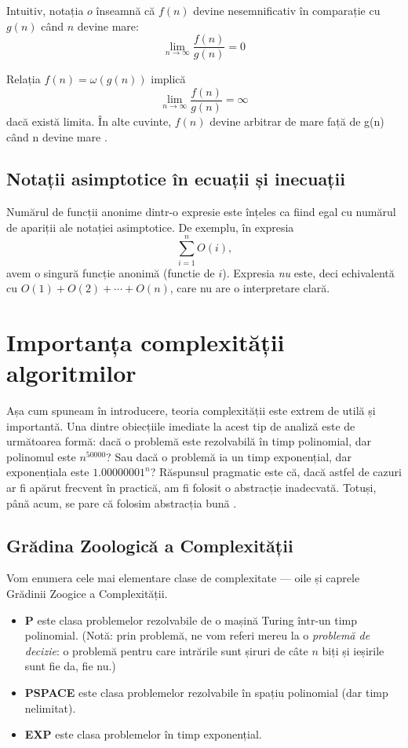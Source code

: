 \documentclass{article}
\begin{document}
Intuitiv, notația $o$ înseamnă că $f(n)$ devine nesemnificativ în comparație cu
$g(n)$ când $n$ devine mare:
\begin{equation*}
	\lim_{n \to \infty} \frac{f(n)}{g(n)} = 0
\end{equation*}

Relația $f(n) = \omega(g(n))$ implică
\begin{equation*}
	\lim_{n \to \infty} \frac{f(n)}{g(n)} = \infty
\end{equation*}
dacă există limita. În alte cuvinte, $f(n)$ devine arbitrar de mare față de g(n)
când n devine mare \cite{clrs}.

\subsection{Notații asimptotice în ecuații și inecuații}
Numărul de funcții anonime dintr-o expresie este înțeles ca fiind egal cu
numărul de apariții ale notației asimptotice. De exemplu, în expresia
\begin{equation*}
	\sum_{i = 1}^{n} O(i) \text{,}
\end{equation*}
avem o singură funcție anonimă (functie de $i$). Expresia \emph{nu} este,
deci echivalentă cu $O(1) + O(2) + \cdots + O(n)$, care nu are o interpretare
clară.

\section{Importanța complexității algoritmilor}
Așa cum spuneam în introducere, teoria complexității este extrem de utilă și
importantă. Una dintre obiecțiile imediate la acest tip de analiză este de
următoarea formă: dacă o problemă este rezolvabilă în timp polinomial, dar
polinomul este $n^{50000}$? Sau dacă o problemă ia un timp exponențial, dar
exponențiala este $1.00000001^n$? Răspunsul pragmatic este că, dacă astfel de
cazuri ar fi apărut frecvent în practică, am fi folosit o abstracție inadecvată.
Totuși, până acum, se pare că folosim abstracția bună \cite{qcsd}.

\subsection{Grădina Zoologică a Complexității}
Vom enumera cele mai elementare clase de complexitate --- oile și caprele
Grădinii Zoogice a Complexității.
\begin{itemize}
	\item \textbf{P} este clasa problemelor rezolvabile de o mașină Turing
	      într-un timp polinomial. (Notă: prin \glqq problemă\grqq, ne vom referi
	      mereu la o \emph{problemă de decizie}: o problemă pentru care intrările sunt
	      șiruri de câte $n$ biți și ieșirile sunt fie \glqq da\grqq, fie \glqq
	      nu\grqq.)
	\item \textbf{PSPACE} este clasa problemelor rezolvabile în spațiu polinomial
	      (dar timp nelimitat).
	\item \textbf{EXP} este clasa problemelor în timp exponențial.
\end{itemize}
\end{document}
